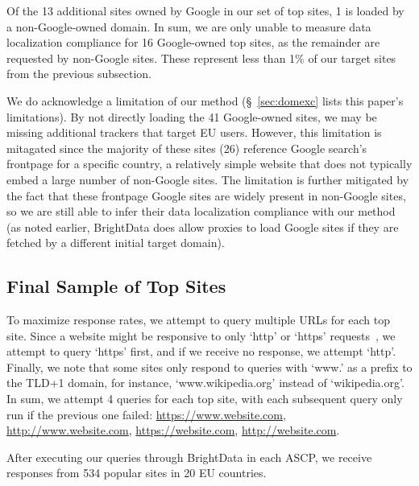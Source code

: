 Of the 13 additional sites owned by Google in our set of top sites,
1 is loaded by a non-Google-owned domain. 
In sum, we are only unable to measure data localization compliance for 
16 Google-owned top sites, as the remainder are requested by non-Google sites. 
These represent less than 1\% of our target
sites from the previous subsection. 

We do acknowledge a limitation of our method (\S~\ref{sec:domexc} lists this paper's
limitations). By not directly loading the 41 Google-owned sites,
we may be missing additional trackers that target EU users. However, this limitation is mitagated
since the majority of these sites (26)
reference Google search's frontpage for a specific country, a relatively simple website that
does not typically embed a large number of non-Google sites. The limitation is further mitigated
by the fact that these frontpage Google sites are widely present in non-Google sites, so we 
are still able to infer their data localization compliance with our method (as noted
earlier, BrightData does
allow proxies to load Google sites if they are fetched by a different initial target domain).

\subsection{Final Sample of Top Sites}
To maximize response rates, we attempt to query multiple URLs for each top site.
Since a website might be responsive to only `http' or `https' requests~\cite{paracha2020deeper}, 
we attempt to query `https' first, and if we receive no response, 
we attempt `http'. Finally, we note that some sites only respond to queries
with `www.' as a prefix to the TLD+1 domain, for instance, `www.wikipedia.org' instead of
`wikipedia.org'. In sum, we attempt 4 queries for each top site, with each
subsequent query only run if the previous one failed:
\url{https://www.website.com}, \url{http://www.website.com}, \url{https://website.com}, \url{http://website.com}.

After executing our queries through BrightData
in each ASCP, we receive responses from 
534 popular sites in 20 EU countries. 

